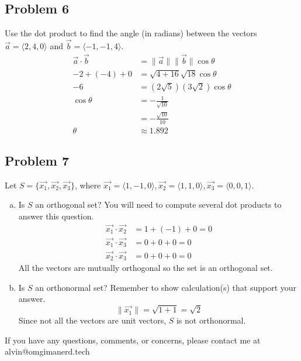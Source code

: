 \documentclass{math}
\begin{document}
\subsection*{Problem 6}
Use the dot product to find the angle (in radians) between the vectors
\( \vec{a} = \langle2,4,0\rangle \) and \( \vec{b} = \langle-1,-1,4\rangle \).
\begin{align*}
  \vec{a}\cdot\vec{b} &= \|\vec{a}\|\|\vec{b}\|\cos\theta \\
  -2+(-4)+0 &= \sqrt{4+16}\sqrt{18}\cos\theta \\
  -6 &= (2\sqrt{5})(3\sqrt{2})\cos\theta \\
  \cos\theta &= -\frac{1}{\sqrt{10}} \\
  &= -\frac{\sqrt{10}}{10} \\
  \theta &\approx 1.892
\end{align*}

\subsection*{Problem 7}
Let \( S = \{\vec{x_1},\vec{x_2},\vec{x_3}\} \), where \( \vec{x_1} =
\langle1,-1,0\rangle, \vec{x_2} = \langle1,1,0\rangle, \vec{x_3} = \langle
0,0,1\rangle \).
\begin{enumerate}[(a)]
  \item Is \( S \) an orthogonal set? You will need to compute several dot
    products to answer this question.
    \begin{align*}
      \vec{x_1}\cdot\vec{x_2} &= 1+(-1)+0 = 0 \\
      \vec{x_1}\cdot\vec{x_3} &= 0+0+0 = 0 \\
      \vec{x_2}\cdot\vec{x_3} &= 0+0+0 = 0
    \end{align*}
    All the vectors are mutually orthogonal so the set is an orthogonal set.
  \item Is \( S \) an orthonormal set? Remember to show calculation(s) that
    support your answer.
    \[ \|\vec{x_1}\| = \sqrt{1+1} = \sqrt{2} \]
    Since not all the vectors are unit vectors, \( S \) is not orthonormal.
\end{enumerate}

\begin{center}
  If you have any questions, comments, or concerns, please contact me at
  alvin@omgimanerd.tech
\end{center}
\end{document}
